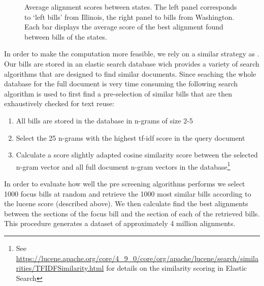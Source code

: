 \documentclass[12pt]{article} %
\begin{document}
\begin{figure}[ht!]
\caption{Average alignment scores between states. The left panel corresponds to `left bills' from Illinois, the right panel to bills from Washington. Each bar displays the average score of the best alignment found between bills of the states.}
\label{fig:state_to_state} 
\end{figure}


In order to make the computation more feasible, we rely on a similar strategy as \citet{wilkerson2015tracing}. Our bills are stored in an elastic search database wich provides a variety of search algorithms that are designed to find similar documents. Since seaching the whole database for the full document is very time consuming the following search algorithm is used to first find a pre-selection of similar bills that are then exhaustively checked for text reuse:

\begin{enumerate}
\item All bills are stored in the database in n-grams of size 2-5
\item Select the 25 n-grams with the highest tf-idf score in the query document
\item Calculate a score slightly adapted cosine similarity score between the selected n-gram vector and all full document n-gram vectors in the database\footnote{See \url{https://lucene.apache.org/core/4_9_0/core/org/apache/lucene/search/similarities/TFIDFSimilarity.html} for details on the similarity scoring in Elastic Search}
\end{enumerate}

In order to evaluate how well the pre screening algorithms performs we select 1000 focus bills at random and retrieve the 1000 most similar bills according to the lucene score (described above). We then calculate find the best alignments between the sections of the focus bill and the section of each of the retrieved bills. This procedure generates a dataset of approximately 4 million alignments. 
\end{document}
